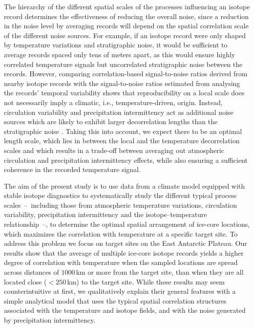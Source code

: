 \documentclass[draft]{agujournal2019}
\begin{document}
The hierarchy of the different spatial scales of the processes influencing an
isotope record determines the effectiveness of reducing the overall noise, since
a reduction in the noise level by averaging records will depend on the spatial
correlation scale of the different noise sources. For example, if an isotope
record were only shaped by temperature variations and stratigraphic noise, it
would be sufficient to average records spaced only tens of meters apart, as this
would ensure highly correlated temperature signals but uncorrelated
stratigraphic noise between the records. However, comparing correlation-based
signal-to-noise ratios derived from nearby isotope records
\cite{Munch2016,Munch2017} with the signal-to-noise ratios estimated from
analysing the records' temporal variability \cite{Laepple2018} shows that
reproducibility on a local scale does not necessarily imply a climatic, i.e.,
temperature-driven, origin. Instead, circulation variability and precipitation
intermittency act as additional noise sources which are likely to exhibit larger
decorrelation lengths than the stratigraphic noise
\cite{Laepple2018,Munch2018a}. Taking this into account, we expect there to be
an optimal length scale, which lies in between the local and the temperature
decorrelation scales and which results in a trade-off between averaging out
atmospheric circulation and precipitation intermittency effects, while also
ensuring a sufficient coherence in the recorded temperature signal.

The aim of the present study is to use data from a climate model equipped with
stable isotope diagnostics to systematically study the different typical process
scales~--~including those from atmospheric temperature variations, circulation
variability, precipitation intermittency and the isotope--temperature
relationship~--, to determine the optimal spatial arrangement of ice-core
locations, which maximizes the correlation with temperature at a specific target
site. To address this problem we focus on target sites on the East Antarctic
Plateau. Our results show that the average of multiple ice-core isotope records
yields a higher degree of correlation with temperature when the sampled
locations are spread across distances of $1000$\,km or more from the target
site, than when they are all located close ($<250$\,km) to the target
site. While these results may seem counterintuitive at first, we qualitatively
explain their general features with a simple analytical model that uses the
typical spatial correlation structures associated with the temperature and
isotope fields, and with the noise generated by precipitation intermittency.
\end{document}
